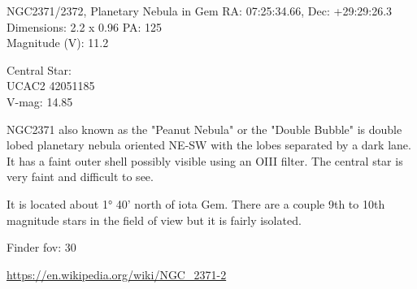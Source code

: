 \begin{block}{NGC2371/2372, Planetary Nebula in Gem}
    RA: 07:25:34.66, Dec: +29:29:26.3 \\ 
    Dimensions: 2.2 x 0.96 PA: 125 \\ 
    Magnitude (V): 11.2

    Central Star: \\ 
      \hspace{1em}UCAC2 42051185 \\ 
      \hspace{1em}V-mag: 14.85 

    NGC2371 also known as the "Peanut Nebula" or the "Double Bubble" is double
    lobed planetary nebula oriented NE-SW with the lobes separated by a dark
    lane. It has a faint outer shell possibly visible using an OIII filter. The
    central star is very faint and difficult to see.

    It is located about 1° 40' north of iota Gem. There are a couple 9th to 10th
    magnitude stars in the field of view but it is fairly isolated.
    
    Finder fov: 30 

    \url{https://en.wikipedia.org/wiki/NGC_2371-2} 
\end{block}
